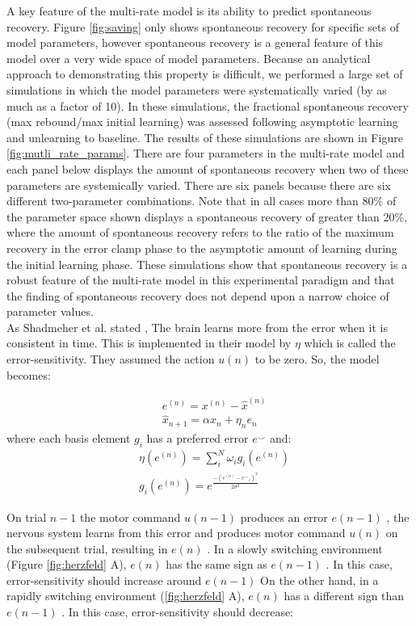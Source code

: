 \documentclass[9pt,twocolumn]{paper-template}
\begin{document}
A key feature of the multi-rate model is its ability to predict spontaneous recovery. Figure \ref{fig:saving} only shows spontaneous recovery for
specific sets of model parameters, however spontaneous recovery is a general feature of this
model over a very wide space of model parameters. Because an analytical approach to
demonstrating this property is difficult, we performed a large set of simulations in which the
model parameters were systematically varied (by as much as a factor of 10). In these simulations, the fractional spontaneous
recovery (max rebound/max initial learning) was assessed following asymptotic learning and
unlearning to baseline. The results of these simulations are shown in Figure \ref{fig:mutli_rate_params}. There are four
parameters in the multi-rate model and each panel below displays the amount of
spontaneous recovery when two of these parameters are systemically varied. There are six
panels because there are six different two-parameter combinations. Note that in all cases
more than 80\% of the parameter space shown displays a spontaneous recovery of greater
than 20\%, where the amount of spontaneous recovery refers to the ratio of the maximum
recovery in the error clamp phase to the asymptotic amount of learning during the initial
learning phase. These simulations show that spontaneous recovery is a robust feature of
the multi-rate model in this experimental paradigm and that the finding of spontaneous
recovery does not depend upon a narrow choice of parameter values.\\



As Shadmeher et al. stated \cite{mem_error}, The brain learns more from the error when it is consistent in time. This is implemented in their model by $\eta$ which is called the error-sensitivity. They assumed the action $u(n)$ to be zero. So, the model becomes:


\begin{eqnarray*}
& e^{(n)} = x^{(n)}-\hat{x}^{(n)}\\
& \hat{x}_{n+1} = \alpha \hat{x}_n + \eta_ne_n
\end{eqnarray*}
where  each basis element $g_i$ has a preferred error $e^\smallsmile$ and:
\begin{eqnarray*}
& \eta(e^{(n)}) = \sum_i^N \omega_ig_i(e^{(n)})\\
&g_i(e^{(n)}) = e^{\frac{-(e^{(n)}-{e^\smallsmile}_i)^2}{2\sigma^2}}
\end{eqnarray*}

On trial $n-1$ the motor command $u(n-1)$ produces an error $e(n-1)$ , the nervous system learns from this error and produces motor command $u (n)$ on the subsequent trial, resulting in $e(n)$ . In a slowly switching environment (Figure \ref{fig:herzfeld} A), $e(n)$ has the same sign as $e(n-1)$ . In this case, error-sensitivity should increase around $e(n-1)$ On the other hand, in a rapidly switching environment (\ref{fig:herzfeld} A), $e(n)$ has a different sign than $e(n-1)$ . In this case, error-sensitivity should decrease:
\end{document}
